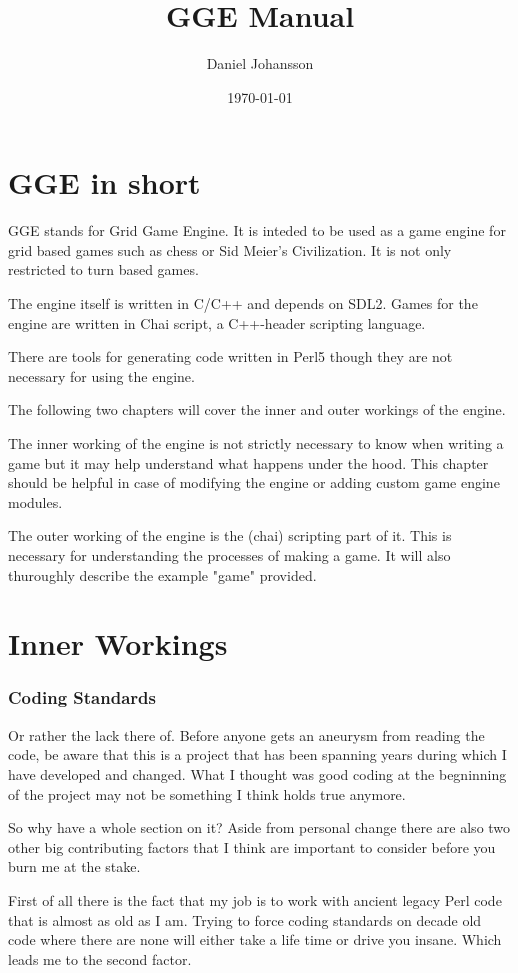 \documentclass{article}
\title{GGE Manual}
\author{Daniel Johansson}
\date{\today}
\begin{document}
\maketitle
\tableofcontents
\part{GGE in short}
GGE stands for Grid Game Engine. It is inteded to be used as a game engine for grid based games such as chess or Sid Meier's Civilization. It is not only restricted to turn based games.

The engine itself is written in C/C++ and depends on SDL2. Games for the engine are written in Chai script, a C++-header scripting language.

There are tools for generating code written in Perl5 though they are not necessary for using the engine.

The following two chapters will cover the inner and outer workings of the engine.

The inner working of the engine is not strictly necessary to know when writing a game but it may help understand what happens under the hood. 
This chapter should be helpful in case of modifying the engine or adding custom game engine modules.

The outer working of the engine is the (chai) scripting part of it. This is necessary for understanding the processes of making a game.
It will also thuroughly describe the example "game" provided.

\part{Inner Workings}

\section{Coding Standards}
Or rather the lack there of. Before anyone gets an aneurysm from reading the code, be aware that this is a project that has been spanning years during which I have developed and changed. What I thought was good coding at the begninning of the
project may not be something I think holds true anymore. 

So why have a whole section on it? 
Aside from personal change there are also two other big contributing factors that I think are important to consider before you burn me at the stake.

First of all there is the fact that my job is to work with ancient legacy Perl code that is almost as old as I am. 
Trying to force coding standards on decade old code where there are none will either take a life time or drive you insane.
Which leads me to the second factor.
\end{document}

